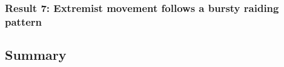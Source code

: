 \documentclass[12pt]{article}
\begin{document}
\subsubsection{Result 7: Extremist movement follows a bursty raiding pattern}

%
%
%

\subsection{Summary}
\label{sec:results_summary}

%


\end{document}
